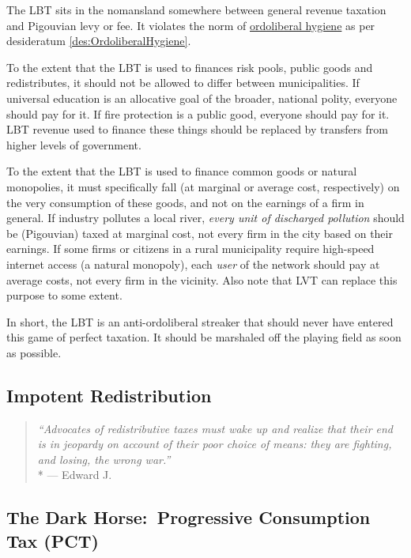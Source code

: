 The LBT sits in the nomansland somewhere between general revenue taxation and Pigouvian levy or fee.
It violates the norm of \hyperref[des:OrdoliberalHygiene]{ordoliberal hygiene} as per desideratum \ref{des:OrdoliberalHygiene}.

To the extent that the LBT is used to finances risk pools, public goods and redistributes, it should not be allowed to differ between municipalities.
If universal education is an allocative goal of the broader, national polity, everyone should pay for it.
If fire protection is a public good, everyone should pay for it.
LBT revenue used to finance these things should be replaced by transfers from higher levels of government.

To the extent that the LBT is used to finance common goods or natural monopolies, it must specifically fall (at marginal or average cost, respectively) on the very consumption of these goods, and not on the earnings of a firm in general.
If industry pollutes a local river, \emph{every unit of discharged pollution} should be (Pigouvian) taxed at marginal cost, not every firm in the city based on their earnings.
If some firms or citizens in a rural municipality require high-speed internet access (a natural monopoly), each \emph{user} of the network should pay at average costs, not every firm in the vicinity.
Also note that LVT can replace this purpose to some extent.

In short, the LBT is an anti-ordoliberal streaker that should never have entered this game of perfect taxation.
It should be marshaled off the playing field as soon as possible.

\subsection{Impotent Redistribution}

\begin{quote}
	\emph{``Advocates of redistributive taxes must wake up and realize that their end is in jeopardy on account of their poor choice of means:
	they are fighting, and losing, the wrong war.''}
	\\*
	--- Edward J. \citet[848]{McCaffery2005}
\end{quote}


\subsection[Progressive Consumption Tax]{The Dark Horse:~Progressive Consumption Tax (PCT)} \label{sec:ScorePCT}

